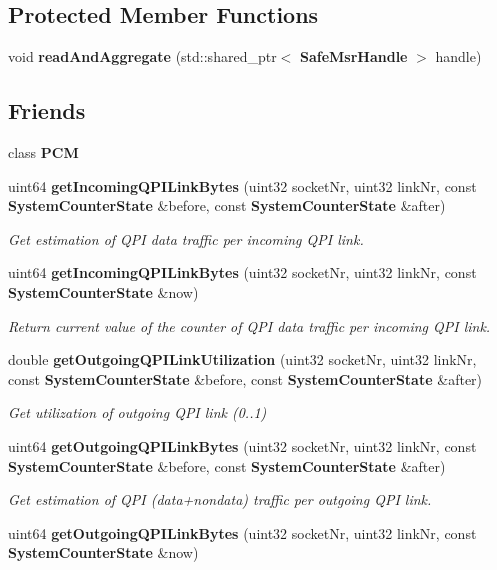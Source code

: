 \subsection*{Protected Member Functions}
\begin{DoxyCompactItemize}
\item 
\mbox{\label{classSystemCounterState_a1755dd4a5ffc57d0423620336aab534b}} 
void {\bfseries read\+And\+Aggregate} (std\+::shared\+\_\+ptr$<$ \textbf{ Safe\+Msr\+Handle} $>$ handle)
\end{DoxyCompactItemize}
\subsection*{Friends}
\begin{DoxyCompactItemize}
\item 
\mbox{\label{classSystemCounterState_ab5f56d2e95ba3daf52c17b8a1d356d64}} 
class {\bfseries P\+CM}
\item 
uint64 \textbf{ get\+Incoming\+Q\+P\+I\+Link\+Bytes} (uint32 socket\+Nr, uint32 link\+Nr, const \textbf{ System\+Counter\+State} \&before, const \textbf{ System\+Counter\+State} \&after)
\begin{DoxyCompactList}\small\item\em Get estimation of Q\+PI data traffic per incoming Q\+PI link. \end{DoxyCompactList}\item 
uint64 \textbf{ get\+Incoming\+Q\+P\+I\+Link\+Bytes} (uint32 socket\+Nr, uint32 link\+Nr, const \textbf{ System\+Counter\+State} \&now)
\begin{DoxyCompactList}\small\item\em Return current value of the counter of Q\+PI data traffic per incoming Q\+PI link. \end{DoxyCompactList}\item 
double \textbf{ get\+Outgoing\+Q\+P\+I\+Link\+Utilization} (uint32 socket\+Nr, uint32 link\+Nr, const \textbf{ System\+Counter\+State} \&before, const \textbf{ System\+Counter\+State} \&after)
\begin{DoxyCompactList}\small\item\em Get utilization of outgoing Q\+PI link (0..1) \end{DoxyCompactList}\item 
uint64 \textbf{ get\+Outgoing\+Q\+P\+I\+Link\+Bytes} (uint32 socket\+Nr, uint32 link\+Nr, const \textbf{ System\+Counter\+State} \&before, const \textbf{ System\+Counter\+State} \&after)
\begin{DoxyCompactList}\small\item\em Get estimation of Q\+PI (data+nondata) traffic per outgoing Q\+PI link. \end{DoxyCompactList}\item 
\mbox{\label{classSystemCounterState_a336f198b4a81e0d34bb581e8bd8be0e0}} 
uint64 {\bfseries get\+Outgoing\+Q\+P\+I\+Link\+Bytes} (uint32 socket\+Nr, uint32 link\+Nr, const \textbf{ System\+Counter\+State} \&now)
\end{DoxyCompactItemize}
